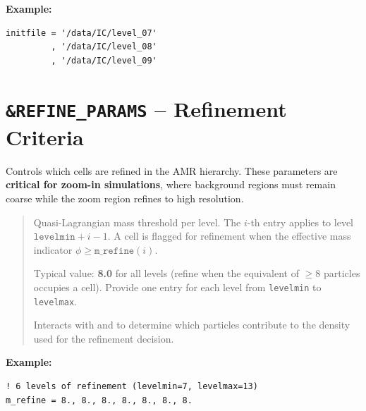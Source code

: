\noindent\textcolor{apidefault}{\textsf{\textbf{Example:}}}
\begin{lstlisting}
initfile = '/data/IC/level_07'
         , '/data/IC/level_08'
         , '/data/IC/level_09'
\end{lstlisting}


\section{\texttt{\&REFINE\_PARAMS} -- Refinement Criteria}
\label{sec:refine_params}

Controls which cells are refined in the AMR hierarchy.  These
parameters are \textbf{critical for zoom-in simulations}, where
background regions must remain coarse while the zoom region refines
to high resolution.

\label{param:m_refine}

\begin{quote}
Quasi-Lagrangian mass threshold per level.  The $i$-th entry applies
to level $\texttt{levelmin}+i-1$.  A cell is flagged for refinement
when the effective mass indicator $\phi \geq \texttt{m\_refine}(i)$.

Typical value: \textbf{8.0} for all levels (refine when the
equivalent of $\geq 8$ particles occupies a cell).  Provide one
entry for each level from \texttt{levelmin} to \texttt{levelmax}.

Interacts with  and
 to determine which particles contribute
to the density used for the refinement decision.
\end{quote}

\noindent\textcolor{apidefault}{\textsf{\textbf{Example:}}}
\begin{lstlisting}
! 6 levels of refinement (levelmin=7, levelmax=13)
m_refine = 8., 8., 8., 8., 8., 8., 8.
\end{lstlisting}

\label{param:ivar_refine}

